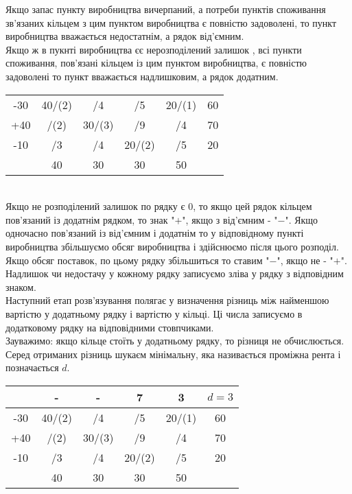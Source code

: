 \documentclass[12pt,a4paper]{book}
\begin{document}
Якщо запас пункту виробництва вичерпаний, а потреби пунктів споживання зв’язаних кільцем з цим пунктом виробництва є повністю задоволені, то пункт виробництва вважається недостатнім, а рядок від’ємним.\\
Якщо ж в пукнті виробництва єє нерозподілений залишок , всі пункти споживання, пов’язані кільцем із цим пунктом виробництва, є повністю задоволені то пункт вважається надлишковим, а рядок додатним.\\
\begin{tabular}{ | c | c | c | c | c | c | }
\hline
	&		&		&		&		&\\
\hline
-30	&	40/(2)	&	/4	&	/5	&	20/(1)	&	60\\
\hline
+40	&	/(2)	&	30/(3)	&	/9	&	/4	&	70\\
\hline
-10	&	/3	&	/4	&	20/(2)	&	/5	&	20\\
\hline
	&	40	&	30	&	30	&	50	&\\
\hline
\end{tabular}\\
Якщо не розподілений залишок по рядку є $0$, то якщо цей рядок кільцем пов’язаний із додатнім рядком, то знак "$+$", якщо з від’ємним - "$-$". Якщо одночасно пов’язаний із від’ємним і додатнім то у відповідному пункті виробництва збільшуємо обсяг виробництва і здійснюємо після цього розподіл. Якщо обсяг поставок, по цьому рядку збільшиться то ставим "$-$", якщо не - "$+$".\\
Надлишок чи недостачу у кожному рядку записуємо зліва у рядку з відповідним знаком.\\
Наступний етап розв’язування полягає у визначення різниць між найменшою вартістю у додатньому рядку і вартістю у кільці. Ці числа записуємо в додатковому рядку на відповідними стовпчиками.\\
Зауважимо: якщо кільце стоїть у додатньому рядку, то різниця не обчислюється.\\
Серед отриманих різниць шукаєм мінімальну, яка називається проміжна рента і позначається $d$.\\
\begin{tabular}{ | c | c | c | c | c | c | }
\hline
	&	-	&	-	&	7	&	3	&	$d=3$\\
\hline
-30	&	40/(2)	&	/4	&	/5	&	20/(1)	&	60\\
\hline
+40	&	/(2)	&	30/(3)	&	/9	&	/4	&	70\\
\hline
-10	&	/3	&	/4	&	20/(2)	&	/5	&	20\\
\hline
	&	40	&	30	&	30	&	50	&\\
\hline
\end{tabular}\\
\end{document}
